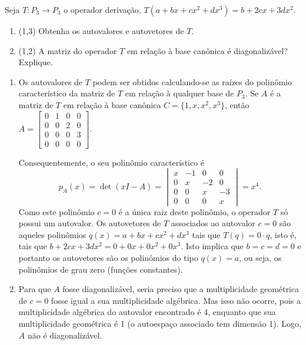 \documentclass[12pt,a4paper]{article}
\begin{document}
\begin{ExerciseList}
\Exercise[title={2,5}] Seja $T: P_3 \to P_3$ o operador derivação, $T(a+bx+cx^2+dx^3) = b+2cx+3dx^2$.
\begin{enumerate}
\item (1,3) Obtenha os autovalores e autovetores de $T$.
\item (1,2) A matriz do operador $T$ em relação à base canônica é diagonalizável? Explique.
\end{enumerate}
\Answer
\begin{enumerate}
\item  Os autovalores de $T$ podem ser obtidos calculando-se as raízes do polinômio característico da matriz de $T$ em relação à qualquer base de $P_3$. Se $A$ é a matriz de $T$ em relação à base canônica $C = \{1, x, x^2, x^3 \}$, então $A = \begin{bmatrix}
0 & 1 & 0 & 0 \\
0 & 0 & 2 & 0 \\
0 & 0 & 0 & 3 \\
0 & 0 & 0 & 0
\end{bmatrix}.$

Consequentemente, o seu polinômio característico é
\[
p_A(x) = \det{(xI - A)} = \begin{vmatrix}
x & -1 & 0 & 0 \\
0 & x & -2 & 0 \\
0 & 0 & x & -3 \\
0 & 0 & 0 & x
\end{vmatrix}
=x^4.
\]
Como este polinômio $c = 0$ é a única raiz deste polinômio, o operador $T$ só possui um autovalor. Os autovetores de $T$ associados ao autovalor $c = 0$ são aqueles polinômios $q(x) = a+bx+cx^2+dx^3$ tais que $T(q) = 0 \cdot q$, isto é, tais que $b+2cx+3dx^2 = 0 + 0x + 0x^2 + 0x^3$. Isto implica que $b=c=d = 0$ e portanto os autovetores são os polinômios do tipo $q(x) = a$, ou seja, os polinômios de grau zero (funções constantes).

\item Para que $A$ fosse diagonalizável, seria preciso que a multiplicidade geométrica de $c = 0$ fosse igual a sua multiplicidade algébrica. Mas isso não ocorre, pois a multiplicidade algébrica do autovalor encontrado é 4, enquanto que sua multiplicidade geométrica é 1 (o autoespaço associado tem dimensão 1). Logo, $A$ não é diagonalizável.
\end{enumerate}




\end{ExerciseList}
\end{document}

